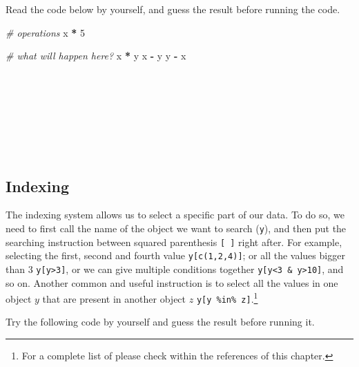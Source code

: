 \documentclass[
]{article}
\newenvironment{Shaded}{\begin{snugshade}}{\end{snugshade}}
\newcommand{\CommentTok}[1]{\textcolor[rgb]{0.56,0.35,0.01}{\textit{#1}}}
\newcommand{\DecValTok}[1]{\textcolor[rgb]{0.00,0.00,0.81}{#1}}
\newcommand{\NormalTok}[1]{#1}
\newcommand{\SpecialCharTok}[1]{\textcolor[rgb]{0.81,0.36,0.00}{\textbf{#1}}}
\begin{document}
Read the code below by yourself, and guess the result before running the
code.

\begin{Shaded}
\begin{Highlighting}[]
\CommentTok{\# operations}
\NormalTok{x }\SpecialCharTok{*} \DecValTok{5}

\CommentTok{\# what will happen here?}
\NormalTok{x }\SpecialCharTok{*}\NormalTok{ y}
\NormalTok{x }\SpecialCharTok{{-}}\NormalTok{ y}
\NormalTok{y }\SpecialCharTok{{-}}\NormalTok{ x}
\end{Highlighting}
\end{Shaded}

~

~

~

~

\hypertarget{indexing}{%
\subsection{Indexing}\label{indexing}}

The indexing system allows us to select a specific part of our data. To
do so, we need to first call the name of the object we want to search
(\texttt{y}), and then put the searching instruction between squared
parenthesis \texttt{{[}\ {]}} right after. For example, selecting the first, second
and fourth value \texttt{y{[}c(1,2,4){]}}; or all the values bigger than 3
\texttt{y{[}y\textgreater{}3{]}}, or we can give multiple conditions together \texttt{y{[}y\textless{}3\ \&\ y\textgreater{}10{]}},
and so on. Another common and useful instruction is to select all the
values in one object \(y\) that are present in another object \(z\)
\texttt{y{[}y\ \%in\%\ z{]}}.\footnote{For a complete list of please check within the references of this
  chapter.}

Try the following code by yourself and guess the result before running
it.
\end{document}
